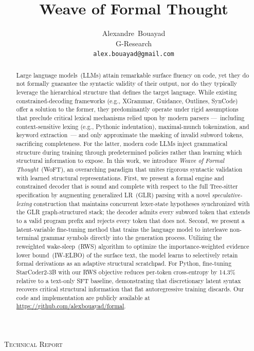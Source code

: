 \documentclass[11pt]{article}
\title{ Weave of Formal Thought}
\author{%
  Alexandre~Bouayad \\
  G-Research \\
  \texttt{alex.bouayad@gmail.com}
}
\theoremstyle{plain}
\theoremstyle{definition}
\begin{document}
\maketitle

\vspace{-1.5em}
\begin{center}
  \large\textsc{Technical Report}
\end{center}
\vspace{1em}

\
\begin{abstract}
  Large language models~(LLMs) attain remarkable surface fluency on code, yet
  they do not formally guarantee the syntactic validity of their output, nor do
  they typically leverage the hierarchical structure that defines the target
  language. While existing constrained-decoding frameworks (e.g., XGrammar,
  Guidance, Outlines, SynCode) offer a solution to the former, they
  predominantly operate under rigid assumptions that preclude critical lexical
  mechanisms relied upon by modern parsers ---~including context-sensitive
  lexing (e.g., Pythonic indentation), maximal-munch tokenization, and keyword
  extraction~--- and only approximate the masking of invalid subword tokens,
  sacrificing completeness. For the latter, modern code LLMs inject grammatical
  structure during training through predetermined policies rather than learning
  which structural information to expose. In this work, we introduce \emph{Weave
  of Formal Thought}~(WoFT), an overarching paradigm that unites rigorous
  syntactic validation with learned structural representations. First, we
  present a formal engine and constrained decoder that is sound and complete
  with respect to the full Tree-sitter specification by augmenting generalized
  LR~(GLR) parsing with a novel \emph{speculative-lexing} construction that
  maintains concurrent lexer-state hypotheses synchronized with the GLR
  graph-structured stack; the decoder admits every subword token that extends to
  a valid program prefix and rejects every token that does not. Second, we
  present a latent-variable fine-tuning method that trains the language model to
  interleave non-terminal grammar symbols directly into the generation process.
  Utilizing the reweighted wake-sleep~(RWS) algorithm to optimize the
  importance-weighted evidence lower bound~(IW-ELBO) of the surface text, the
  model learns to selectively retain formal derivations as an adaptive
  structural scratchpad. For Python, fine-tuning StarCoder2-3B with our RWS
  objective reduces per-token cross-entropy by 14.3\% relative to a text-only
  SFT baseline, demonstrating that discretionary latent syntax recovers critical
  structural information that flat autoregressive training discards. Our code
  and implementation are publicly available at
  \url{https://github.com/alexbouayad/formal}.
\end{abstract}
\end{document}
